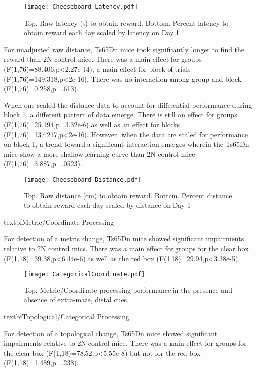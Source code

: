 \documentclass{article}
\begin{document}
\begin{figure}[h!]
\centering
\texttt{[image: Cheeseboard\_Latency.pdf]}
\caption{Top. Raw latency (s) to obtain reward. Bottom. Percent latency to obtain reward each day scaled by latency on Day 1}
\label{fig:Cheeseboard Latency}
\end{figure}

For unadjusted raw distance, Ts65Dn mice took significantly longer to find the reward than 2N control mice. There was a main effect for groups (F(1,76)=88.406,p<2.27e-14), a main effect for block of trials (F(1,76)=149.318,p<2e-16). There was no interaction among group and block (F(1,76)=0.258,p=.613).

When one scaled the distance data to account for differential performance during block 1, a different pattern of data emerge. There is still an effect for groups (F(1,76)=25.194,p=3.32e-6) as well as an effect for blocks (F(1,76)=137.217,p<2e-16). However, when the data are scaled for performance on block 1, a trend toward a significant interaction emerges wherein the Ts65Dn mice show a more shallow learning curve than 2N control mice (F(1,76)=3.887,p=.0523).

\begin{figure}[h!]
\centering
\texttt{[image: Cheeseboard\_Distance.pdf]}
\caption{Top. Raw distance (cm) to obtain reward. Bottom. Percent distance to obtain reward each day scaled by distance on Day 1}
\label{fig:Cheeseboard Distace}
\end{figure}

textbf{Metric/Coordinate Processing}

For detection of a metric change, Ts65Dn mice showed significant impairments relative to 2N control mice. There was a main effect for groups for the clear box (F(1,18)=39.38,p<6.44e-6) as well as the red box (F(1,18)=29.94,p<3.38e-5).

\begin{figure}[h!]
\centering
\texttt{[image: CategoricalCoordinate.pdf]}
\caption{Top. Metric/Coordinate processing performance in the presence and absence of extra-maze, distal cues.}
\label{fig:MetricTopological}
\end{figure}

textbf{Topological/Categorical Processing}

For detection of a topological change, Ts65Dn mice showed significant impairments relative to 2N control mice. There was a main effect for groups for the clear box (F(1,18)=78.52,p<5.55e-8) but not for the red box (F(1,18)=1.489,p=.238).
\end{document}
